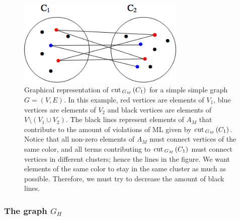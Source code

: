 \begin{figure}
\begin{center}
\includegraphics[width=8cm]{figures/gm.png}
\end{center}
   \caption[Graphical representation of $\cut_{G_M\,}(C_1)$ for a simple graph $G=(V,E)$]{Graphical representation of $\cut _{G_M\,}(C_1)$ for a simple simple graph $G = (V,E)$.  In this example, red vertices are elements of $V_1$, blue vertices are elements of $V_2$ and black vertices are elements of $V \setminus (V_1 \cup V_2)$. The black lines represent elements of $A_M$ that contribute to the amount of violations of ML given by $\cut _{G_M\,}(C_1)$. Notice that all non-zero elements of $A_M$ must connect vertices of the same color, and all terms contributing to $\cut _{G_M\,}(C_1)$ must connect vertices in different clusters; hence the lines in the figure. We want elements of the same color to stay in the same cluster as much as possible. Therefore, we must try to decrease the amount of black lines.}
\label{gm}
\end{figure}

\subsubsection*{The graph $G_H$}










